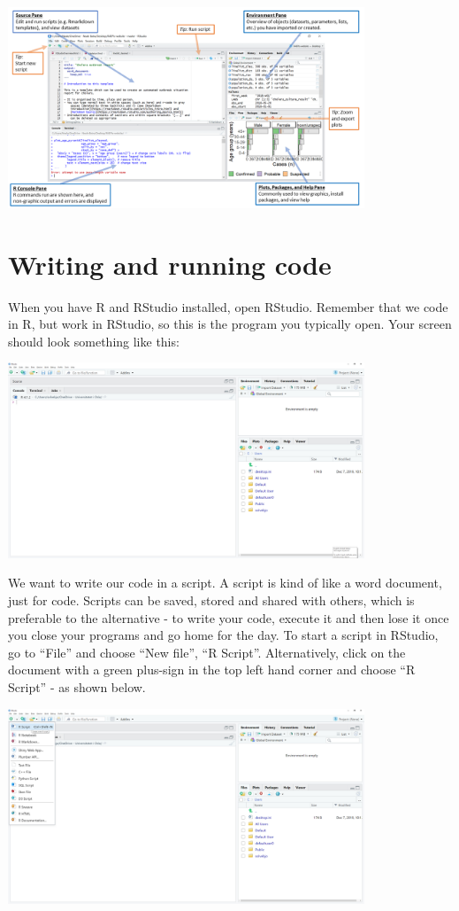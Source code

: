 \documentclass[
]{article}
\begin{document}
\includegraphics[width=0.8\textwidth,height=\textheight]{./figures/RStudio_overview.png}

\hypertarget{writing-and-running-code}{%
\section{Writing and running code}\label{writing-and-running-code}}

When you have R and RStudio installed, open RStudio. Remember that we
code in R, but work in RStudio, so this is the program you typically
open. Your screen should look something like this:

\includegraphics[width=0.8\textwidth,height=\textheight]{./figures/rstudio_1.png}

We want to write our code in a script. A script is kind of like a word
document, just for code. Scripts can be saved, stored and shared with
others, which is preferable to the alternative - to write your code,
execute it and then lose it once you close your programs and go home for
the day. To start a script in RStudio, go to ``File'' and choose ``New
file'', ``R Script''. Alternatively, click on the document with a green
plus-sign in the top left hand corner and choose ``R Script'' - as shown
below.

\includegraphics[width=0.8\textwidth,height=\textheight]{./figures/rstudio_2.png}
\end{document}
